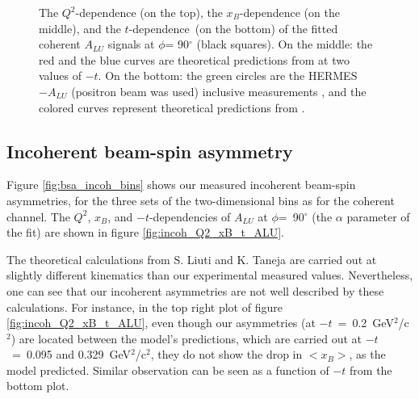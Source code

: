 \begin{figure}[tpb]
\caption{The $Q^{2}$-dependence (on the top), the $x_{B}$-dependence (on the 
   middle), and the $t$-dependence~(on the bottom) of the fitted coherent 
   $A_{LU}$ signals at $\phi$= 90$^{\circ}$ (black squares). On the middle: the red and the 
   blue curves are theoretical predictions from \cite{simonetta_2} at two 
values of $-t$. On the bottom: the green circles are the HERMES $-A_{LU}$ 
(positron beam was used) inclusive measurements \cite{HERMES_BSA}, and the 
colored curves represent theoretical predictions from \cite{simonetta_2}.} 
\label{fig:coh_Q2_xB_t_ALU}
\end{figure}


\subsection{Incoherent beam-spin asymmetry}
Figure \ref{fig:bsa_incoh_bins} shows our measured incoherent beam-spin 
asymmetries, for the three sets of the two-dimensional bins as for the coherent 
channel. The $Q^2$, $x_{B}$, and $-t$-dependencies of $A_{LU}$ at 
$\phi$=~90$^{\circ}$ (the $\alpha$ parameter of the fit) are shown in figure 
\ref{fig:incoh_Q2_xB_t_ALU}.

The theoretical calculations from S. Liuti and K. Taneja are carried out at 
slightly different kinematics than our experimental measured values.  
Nevertheless, one can see that our incoherent asymmetries are not well 
described by these calculations. For instance, in the top right plot of figure 
\ref{fig:incoh_Q2_xB_t_ALU}, even though our asymmetries (at 
$-t$~=~0.2~GeV$^2$/c$^2$) are located between the model's predictions, which 
are carried out at $-t$~=~0.095 and 0.329~GeV$^2$/c$^2$, they do not show the 
drop in $<x_B>$, as the model predicted. Similar observation can be seen as a 
function of $-t$ from the bottom plot.

